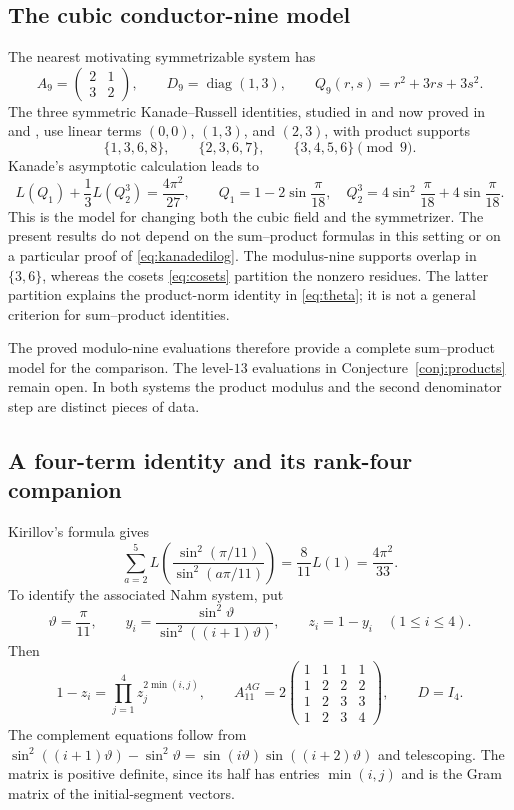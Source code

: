 \documentclass[11pt,reqno]{amsart}
\theoremstyle{remark}
\numberwithin{equation}{section}
\begin{document}
\subsection{The cubic conductor-nine model}
The nearest motivating symmetrizable system has
\[
 A_9=\begin{pmatrix}2&1\\3&2\end{pmatrix},\qquad
 D_9=\operatorname{diag}(1,3),\qquad
 Q_9(r,s)=r^2+3rs+3s^2.
\]
The three symmetric Kanade--Russell identities, studied in
\cite{Kanade,KursungozKR,Mizuno} and now proved in
\cite[Theorem~1.1]{MizunoKR} and \cite[Theorem~1.1]{Xia},
use linear terms $(0,0)$, $(1,3)$, and $(2,3)$, with product supports
\[
 \{1,3,6,8\},\qquad \{2,3,6,7\},\qquad \{3,4,5,6\}\pmod9.
\]
Kanade's asymptotic calculation leads to
\begin{equation}\label{eq:kanadedilog}
 L(Q_1)+\frac13L(Q_2^3)=\frac{4\pi^2}{27},\qquad
 Q_1=1-2\sin\frac\pi{18},\quad
 Q_2^3=4\sin^2\frac\pi{18}+4\sin\frac\pi{18}.
\end{equation}
This is the model for changing both the cubic field and the symmetrizer.
The present results do not depend on the sum--product formulas in this
setting or on a particular proof of \eqref{eq:kanadedilog}.
The modulus-nine supports overlap in $\{3,6\}$, whereas the cosets
\eqref{eq:cosets} partition the nonzero residues. The latter partition
explains the product-norm identity in \eqref{eq:theta}; it is not a general criterion for
sum--product identities.

The proved modulo-nine evaluations therefore provide a complete
sum--product model for the comparison. The level-$13$ evaluations in
Conjecture~\ref{conj:products} remain open. In both systems the product
modulus and the second denominator step are distinct pieces of data.

\subsection{A four-term identity and its rank-four companion}
\label{sec:AG}
Kirillov's formula \cite[(1.16), with $r=9$ and $j=0$]{Kirillov} gives
\begin{equation}\label{eq:AGdilog}
 \sum_{a=2}^{5}L\!\left(\frac{\sin^2(\pi/11)}{\sin^2(a\pi/11)}\right)
 =\frac8{11}L(1)=\frac{4\pi^2}{33}.
\end{equation}
To identify the associated Nahm system, put
\[
 \vartheta=\frac\pi{11},\qquad
 y_i=\frac{\sin^2\vartheta}{\sin^2((i+1)\vartheta)},\qquad
 z_i=1-y_i\quad(1\leq i\leq4).
\]
Then
\begin{equation}\label{eq:AGmatrix}
 1-z_i=\prod_{j=1}^4z_j^{2\min(i,j)},\qquad
 A_{11}^{AG}=2\begin{pmatrix}1&1&1&1\\1&2&2&2\\1&2&3&3\\1&2&3&4\end{pmatrix},
 \qquad D=I_4.
\end{equation}
The complement equations follow from
$\sin^2((i+1)\vartheta)-\sin^2\vartheta
=\sin(i\vartheta)\sin((i+2)\vartheta)$ and telescoping.
The matrix is positive definite, since its half has entries
$\min(i,j)$ and is the Gram matrix of the initial-segment vectors.
\end{document}
